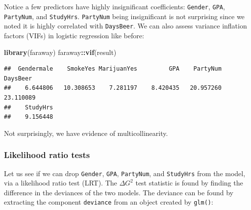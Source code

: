 \documentclass[
]{book}
\newenvironment{Shaded}{\begin{snugshade}}{\end{snugshade}}
\newcommand{\AttributeTok}[1]{\textcolor[rgb]{0.13,0.29,0.53}{#1}}
\newcommand{\DocumentationTok}[1]{\textcolor[rgb]{0.56,0.35,0.01}{\textbf{\textit{#1}}}}
\newcommand{\FunctionTok}[1]{\textcolor[rgb]{0.13,0.29,0.53}{\textbf{#1}}}
\newcommand{\NormalTok}[1]{#1}
\newcommand{\OtherTok}[1]{\textcolor[rgb]{0.56,0.35,0.01}{#1}}
\newcommand{\SpecialCharTok}[1]{\textcolor[rgb]{0.81,0.36,0.00}{\textbf{#1}}}
\begin{document}
Notice a few predictors have highly insignificant coefficients: \texttt{Gender}, \texttt{GPA}, \texttt{PartyNum}, and \texttt{StudyHrs}. \texttt{PartyNum} being insignificant is not surprising since we noted it is highly correlated with \texttt{DaysBeer}. We can also assess variance inflation factors (VIFs) in logistic regression like before:

\begin{Shaded}
\begin{Highlighting}[]
\FunctionTok{library}\NormalTok{(faraway)}
\NormalTok{faraway}\SpecialCharTok{::}\FunctionTok{vif}\NormalTok{(result)}
\end{Highlighting}
\end{Shaded}

\begin{verbatim}
##  Gendermale    SmokeYes MarijuanYes         GPA    PartyNum    DaysBeer 
##    6.644806   10.308653    7.281197    8.420435   20.957260   23.110089 
##    StudyHrs 
##    9.156448
\end{verbatim}

Not surprisingly, we have evidence of multicollinearity.

\hypertarget{likelihood-ratio-tests}{%
\subsubsection*{Likelihood ratio tests}\label{likelihood-ratio-tests}}

Let us see if we can drop \texttt{Gender}, \texttt{GPA}, \texttt{PartyNum}, and \texttt{StudyHrs} from the model, via a likelihood ratio test (LRT). The \(\Delta G^2\) test statistic is found by finding the difference in the deviances of the two models. The deviance can be found by extracting the component \texttt{deviance} from an object created by \texttt{glm()}:

\begin{Shaded}
\end{Shaded}
\end{document}
